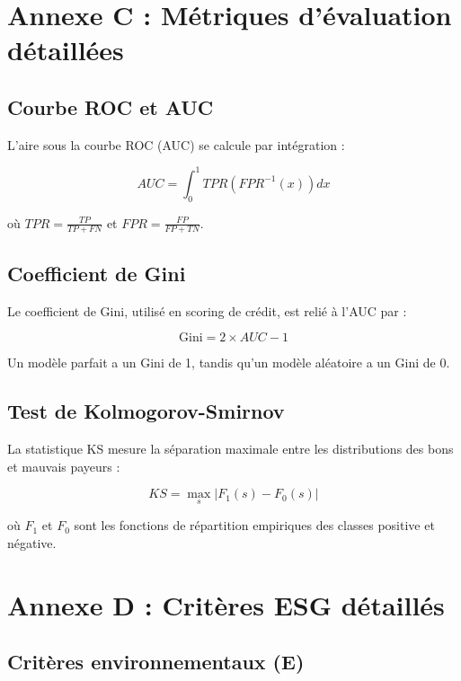 \section{Annexe C : Métriques d'évaluation détaillées}

\subsection{Courbe ROC et AUC}

L'aire sous la courbe ROC (AUC) se calcule par intégration :

\begin{equation}
AUC = \int_0^1 TPR(FPR^{-1}(x)) dx
\end{equation}

où $TPR = \frac{TP}{TP + FN}$ et $FPR = \frac{FP}{FP + TN}$.

\subsection{Coefficient de Gini}

Le coefficient de Gini, utilisé en scoring de crédit, est relié à l'AUC par :

\begin{equation}
\text{Gini} = 2 \times AUC - 1
\end{equation}

Un modèle parfait a un Gini de 1, tandis qu'un modèle aléatoire a un Gini de 0.

\subsection{Test de Kolmogorov-Smirnov}

La statistique KS mesure la séparation maximale entre les distributions des bons et mauvais payeurs :

\begin{equation}
KS = \max_s |F_1(s) - F_0(s)|
\end{equation}

où $F_1$ et $F_0$ sont les fonctions de répartition empiriques des classes positive et négative.

\section{Annexe D : Critères ESG détaillés}

\subsection{Critères environnementaux (E)}


